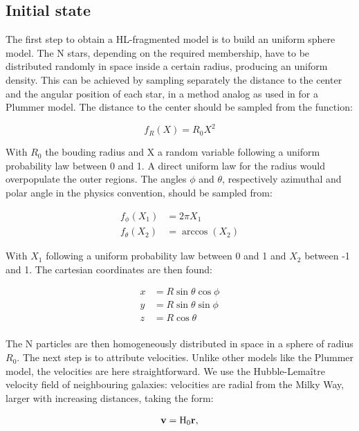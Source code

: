 \subsection{Initial state}

The first step to obtain a HL-fragmented model is to build an uniform sphere model. The N stars, depending on the required membership, have to be distributed randomly in space inside a certain radius, producing an uniform density. This can be achieved by sampling separately the distance to the center and the angular position of each star, in a method analog as used in \cite{Aarseth1974} for a Plummer model. The distance to the center should be sampled from the function:

\begin{equation}
f_R(X) = R_0 X^2
\end{equation} 

With $R_0$ the bouding radius and X a random variable following a uniform probability law between 0 and 1. A direct uniform law for the radius would overpopulate the outer regions. The angles $\phi$ and $\theta$, respectively azimuthal and polar angle in the physics convention, should be sampled from:


\begin{align}
f_\phi(X_1) & = 2\pi X_1\\
f_\theta(X_2) &= \arccos{ (X_2) }
\end{align}

With $X_1$ following a uniform probability law between 0 and 1 and $X_2$ between -1 and 1. The cartesian coordinates are then found:

\begin{align}
x &= R \sin{\theta} \cos{\phi}\\
y &= R \sin{\theta} \sin{\phi}\\
z &= R \cos{\theta} \\
\end{align}

The N particles are then homogeneously distributed in space in a sphere of radius $R_0$. The next step is to attribute velocities. Unlike other models like the Plummer model, the velocities are here straightforward. We use the Hubble-Lema\^itre velocity field of neighbouring galaxies: velocities are radial from the Milky Way, larger with increasing distances, taking the form:

\begin{equation}
\label{Eq:1_Hubble}
\bold{v} =  \textrm{H}_0 \bold{r},
\end{equation}

